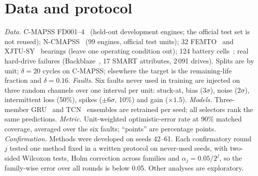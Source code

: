 \documentclass{esannV2}
\begin{document}
\section{Data and protocol}
\emph{Data.} C-MAPSS FD001--4~\cite{saxena2008damage} (held-out development engines; the official test set is not reused); N-CMAPSS~\cite{arias2021ncmapss} (99 engines, official test units); 32 FEMTO~\cite{nectoux2012pronostia} and XJTU-SY~\cite{wang2020xjtusy} bearings (leave one operating condition out); 124 battery cells~\cite{severson2019battery}; real hard-drive failures (Backblaze~\cite{backblaze}, 17 SMART attributes, 2\,091 drives). Splits are by unit; $\delta=20$ cycles on C-MAPSS; elsewhere the target is the remaining-life fraction and $\delta=0.16$.
\emph{Faults.} Six faults never used in training are injected on three random channels over one interval per unit: stuck-at, bias ($3\sigma$), noise ($2\sigma$), intermittent loss (50\%), spikes ($\pm6\sigma$, 10\%) and gain ($\times1.5$).
\emph{Models.} Three-member GRU~\cite{cho2014learning} and TCN~\cite{bai2018empirical} ensembles are retrained per seed; all selectors rank the same predictions.
\emph{Metric.} Unit-weighted optimistic-error rate at 90\% matched coverage, averaged over the six faults; ``points'' are percentage points.
\emph{Confirmation.} Methods were developed on seeds 42--61. Each confirmatory round $j$ tested one method fixed in a written protocol on never-used seeds, with two-sided Wilcoxon tests, Holm correction across families and $\alpha_j=0.05/2^j$, so the family-wise error over all rounds is below 0.05. Other analyses are exploratory.

\end{document}
